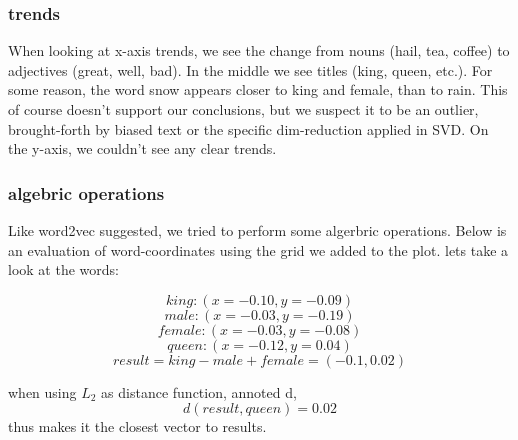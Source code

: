 \documentclass{article}
\begin{document}
\subsubsection{trends}
When looking at x-axis trends, we see the change from nouns (hail, tea, coffee) to adjectives (great, well, bad). In the middle we see titles (king, queen, etc.). For some reason, the word snow appears closer to king and female, than to rain. This of course doesn't support our conclusions, but we suspect it to be an outlier, brought-forth by biased text or the specific dim-reduction applied in SVD.
On the y-axis, we couldn't see any clear trends.
\subsubsection{algebric operations}
Like word2vec suggested, we tried to perform some algerbric operations. Below is an evaluation of word-coordinates using the grid we added to the plot.
lets take a look at the words:

\[king: (x = -0.10, y = -0.09)\]
\[male: (x = -0.03, y = -0.19)\]
\[female: (x = -0.03, y = -0.08)\]
\[queen: (x = -0.12, y = 0.04)\]
\[result = king - male + female = (-0.1, 0.02)\]

when using $L_2$ as distance function, annoted d, \[d(result, queen)=0.02\] thus makes it the closest vector to results. 
\end{document}
